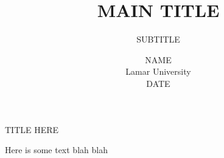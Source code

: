 \documentclass[8pt]{beamer}
\title{MAIN TITLE}
\author{SUBTITLE}
\institute{\texttt{[image: lamar\_logo.jpeg]}}
\date{NAME \\[0.5pt]
Lamar University \\[0.5pt]
DATE}
\begin{document}

\begin{frame}

\maketitle

\end{frame}


\begin{frame}{TITLE HERE}

Here is some text blah blah
    
\end{frame}
\end{document}
